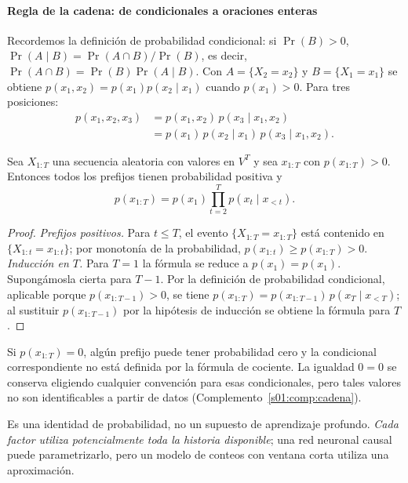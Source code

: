 \paragraph{Regla de la cadena: de condicionales a oraciones enteras}
Recordemos la definición de probabilidad condicional: si $\Pr(B)>0$,
$\Pr(A\mid B)=\Pr(A\cap B)/\Pr(B)$, es decir, $\Pr(A\cap B)=\Pr(B)\Pr(A\mid B)$.
Con $A=\{X_2=x_2\}$ y $B=\{X_1=x_1\}$ se obtiene $p(x_1,x_2)=p(x_1)p(x_2\mid x_1)$
cuando $p(x_1)>0$. Para tres posiciones:
\begin{align*}
p(x_1,x_2,x_3)&=p(x_1,x_2)\,p(x_3\mid x_1,x_2)\\
&=p(x_1)\,p(x_2\mid x_1)\,p(x_3\mid x_1,x_2).
\end{align*}
\begin{proposicion}\label{s01:prop:cadena}
Sea $X_{1:T}$ una secuencia aleatoria con valores en $V^T$ y sea $x_{1:T}$ con
$p(x_{1:T})>0$. Entonces todos los prefijos tienen probabilidad positiva y
\[
\boxed{\displaystyle p(x_{1:T})=p(x_1)\prod_{t=2}^T p(x_t\mid x_{<t}).}
\]
\end{proposicion}
\begin{proof}
\emph{Prefijos positivos.} Para $t\le T$, el evento $\{X_{1:T}=x_{1:T}\}$ está
contenido en $\{X_{1:t}=x_{1:t}\}$; por monotonía de la probabilidad,
$p(x_{1:t})\ge p(x_{1:T})>0$.
\emph{Inducción en $T$.} Para $T=1$ la fórmula se reduce a $p(x_1)=p(x_1)$.
Supongámosla cierta para $T-1$. Por la definición de probabilidad condicional,
aplicable porque $p(x_{1:T-1})>0$, se tiene
$p(x_{1:T})=p(x_{1:T-1})\,p(x_T\mid x_{<T})$; al sustituir $p(x_{1:T-1})$ por la
hipótesis de inducción se obtiene la fórmula para $T$.
\end{proof}
\begin{observacion}
Si $p(x_{1:T})=0$, algún prefijo puede tener probabilidad cero y la condicional
correspondiente no está definida por la fórmula de cociente. La igualdad
$0=0$ se conserva eligiendo cualquier convención para esas condicionales, pero
tales valores no son identificables a partir de datos (Complemento~\ref{s01:comp:cadena}).
\end{observacion}
Es una identidad de probabilidad, no un supuesto de aprendizaje profundo.
\emph{Cada factor utiliza potencialmente toda la historia disponible}; una red
neuronal causal puede parametrizarlo, pero un modelo de conteos con ventana corta
utiliza una aproximación.
